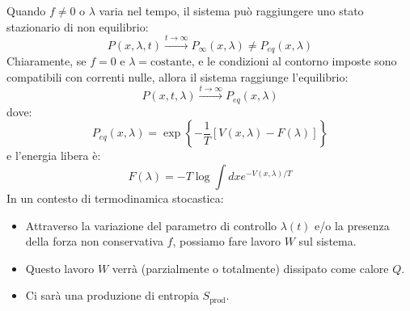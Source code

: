 \noindent Quando $f \neq 0$ o $\lambda$ varia nel tempo, il sistema può raggiungere uno stato stazionario di non equilibrio:
\begin{equation*}
P(x,\lambda,t) \xrightarrow{t\rightarrow\infty} P_{\infty}(x,\lambda) \neq P_{eq}(x,\lambda)
\end{equation*}
Chiaramente, se $f=0$ e $\lambda=\text{costante}$, e le condizioni al contorno imposte sono compatibili con correnti nulle, allora il sistema raggiunge l'equilibrio:
\begin{equation*}
P(x,t,\lambda) \xrightarrow{t\rightarrow\infty} P_{eq}(x,\lambda)
\end{equation*}
dove:
\begin{equation}
P_{eq}(x,\lambda)=\exp\left\{-\frac{1}{T}[V(x,\lambda)-F(\lambda)]\right\}
\end{equation}
e l'energia libera è:
\begin{equation}
F(\lambda)=-T\log\int dx e^{-V(x,\lambda)/T}
\end{equation}
In un contesto di termodinamica stocastica:
\begin{itemize}
    \item Attraverso la variazione del parametro di controllo $\lambda(t)$ e/o la presenza della forza non conservativa $f$, possiamo fare lavoro $W$ sul sistema.
    \item Questo lavoro $W$ verrà (parzialmente o totalmente) dissipato come calore $Q$.
    \item Ci sarà una produzione di entropia $S_{\text{prod}}$.
\end{itemize}